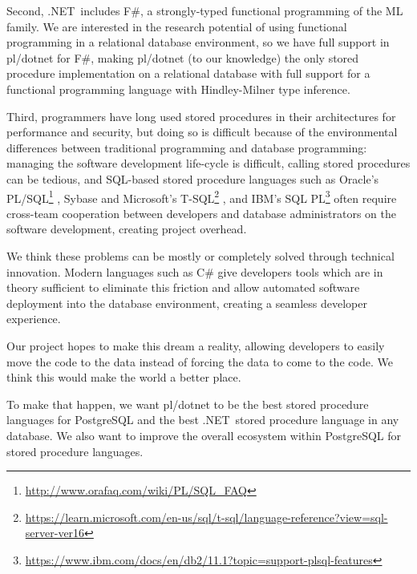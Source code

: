 \documentclass[sigconf,techreport,authorversion,nonacm]{acmart}
\newcommand{\dotnet}{.NET}
\begin{document}
Second, \dotnet\ includes F\#, a strongly-typed functional programming
of the ML family. We are interested in the research potential of
using functional programming in a relational database environment,
so we have full support in pl/dotnet for F\#, making pl/dotnet (to
our knowledge) the only stored procedure implementation on a
relational database with full support for a functional programming
language with Hindley-Milner type inference.

Third, programmers have long used stored procedures in their architectures
for performance and security, but doing so is difficult because of
the environmental differences between traditional programming and
database programming: managing the software development life-cycle
is difficult, calling stored procedures can be tedious, and SQL-based
stored procedure languages such as Oracle's PL/SQL\footnote{\url{http://www.orafaq.com/wiki/PL/SQL_FAQ}}
, Sybase and Microsoft's T-SQL\footnote{\url{https://learn.microsoft.com/en-us/sql/t-sql/language-reference?view=sql-server-ver16}}
, and IBM's SQL PL\footnote{\url{https://www.ibm.com/docs/en/db2/11.1?topic=support-plsql-features}}
often require cross-team cooperation between developers and
database administrators on the software development, creating
project overhead.

We think these problems can be mostly or completely solved through
technical innovation.  Modern languages such as C\# give developers
tools which are in theory sufficient to eliminate this friction and
allow automated software deployment into the database environment,
creating a seamless developer experience.

Our project hopes to make this dream a reality, allowing developers
to easily move the code to the data instead of forcing the data to
come to the code. We think this would make the world a better place.

To make that happen, we want pl/dotnet to be the best stored procedure
languages for PostgreSQL and the best \dotnet\ stored procedure
language in any database.  We also want to improve the overall
ecosystem within PostgreSQL for stored procedure languages.
\end{document}
